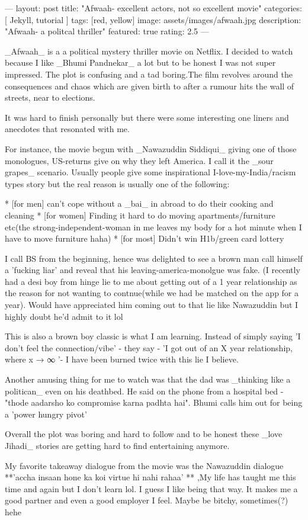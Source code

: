 ---
layout: post
title: "Afwaah- excellent actors, not so excellent movie"
categories: [ Jekyll, tutorial ]
tags: [red, yellow]
image: assets/images/afwaah.jpg
description: "Afwaah- a politcal thriller"
featured: true
rating: 2.5
---

_Afwaah_ is a a political mystery thriller movie on Netflix. I decided to watch because I like _Bhumi Pandnekar_ a lot but to be honest I was not super impressed. The plot is confusing and a tad boring.The film revolves around the consequences and chaos which are given birth to after a rumour hits the wall of streets, near to elections.

It was hard to finish personally but there were some interesting one liners and anecdotes that resonated with me.

For instance, the movie begun with _Nawazuddin Siddiqui_ giving one of those monologues, US-returns give on why they left America. I call it the _sour grapes_ scenario. Usually people give some inspirational I-love-my-India/racism types story but the real reason is usually one of the following:

*  [for men] can't cope without a _bai_ in abroad to do their cooking and cleaning
*  [for women] Finding it hard to do moving apartments/furniture etc(the strong-independent-woman in me leaves my body for a hot minute when I have to move furniture haha)
* [for most] Didn't win H1b/green card lottery

I call BS from the beginning, hence was delighted to see a brown man call himself a 'fucking liar' and reveal that his leaving-america-monolgue was fake. (I recently had a desi boy from hinge lie to me about getting out of a 1 year relationship as the reason for not wanting to contnue(while we had be matched on the app for a year). Would have appreciated him coming out to that lie like Nawazuddin but I highly doubt he'd admit to it lol

This is also a brown boy classic is what I am learning. Instead of simply saying 'I don't feel the connection/vibe' - they say - 'I got out of an X year relationship, where x → ∞ '- I have been burned twice with this lie I believe.

Another amusing thing for me to watch was that the dad was _thinking like a politican_ even on his deathbed. He said on the phone from a hospital bed - "thode aadarsho ko compromise karna padhta hai".  Bhumi calls him out for being a 'power hungry pivot'

Overall the plot was boring and hard to follow and to be honest these _love Jihadi_ stories are getting hard to find entertaining anymore.

My favorite takeaway dialogue from the movie was the Nawazuddin dialogue **'accha insaan hone ka koi virtue hi nahi rahaa' ** ,My life has taught me this time and again but I don't learn lol. I guess I like being that way. It makes me a good partner and even a good employer I feel. Maybe be bitchy, sometimes(?) hehe

